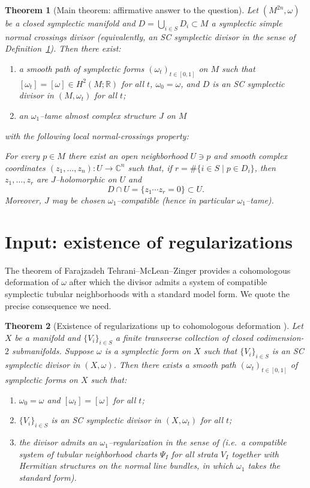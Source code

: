 \documentclass[11pt]{article}
\newtheorem{theorem}{Theorem}
\theoremstyle{definition}
\begin{document}
\begin{theorem}[Main theorem: affirmative answer to the question]\label{thm:main}
Let $(M^{2n},\omega)$ be a closed symplectic manifold and $D=\bigcup_{i\in S}D_i\subset M$ a symplectic
simple normal crossings divisor (equivalently, an SC symplectic divisor in the sense of
Definition~\ref{thm:main}).
Then there exist:
\begin{enumerate}
\item a smooth path of symplectic forms $(\omega_t)_{t\in[0,1]}$ on $M$ such that $[\omega_t]=[\omega]\in H^2(M;\mathbb R)$ for all $t$, $\omega_0=\omega$, and $D$ is an SC symplectic divisor in $(M,\omega_t)$ for all $t$;
\item an $\omega_1$--tame almost complex structure $J$ on $M$
\end{enumerate}
with the following local normal-crossings property:

For every $p\in M$ there exist an open neighborhood $U\ni p$ and smooth complex coordinates
$(z_1,\dots,z_n)\colon U\to\mathbb C^n$ such that, if $r=\#\{i\in S\mid p\in D_i\}$, then
$z_1,\dots,z_r$ are $J$--holomorphic on $U$ and
\[
D\cap U = \{z_1\cdots z_r=0\}\subset U.
\]
Moreover, $J$ may be chosen $\omega_1$--compatible (hence in particular $\omega_1$--tame).
\end{theorem}

\section{Input: existence of regularizations}

The theorem of Farajzadeh Tehrani--McLean--Zinger provides a cohomologous deformation of $\omega$
after which the divisor admits a system of compatible symplectic tubular neighborhoods with a standard
model form. We quote the precise consequence we need.

\begin{theorem}[Existence of regularizations up to cohomologous deformation {\cite[Thm.~2.13]{FTMZ}}]\label{thm:ftmz-regularization}
Let $X$ be a manifold and $\{V_i\}_{i\in S}$ a finite transverse collection of closed codimension-$2$
submanifolds. Suppose $\omega$ is a symplectic form on $X$ such that $\{V_i\}_{i\in S}$ is an SC symplectic
divisor in $(X,\omega)$.
Then there exists a smooth path $(\omega_t)_{t\in[0,1]}$ of symplectic forms on $X$ such that:
\begin{enumerate}
\item $\omega_0=\omega$ and $[\omega_t]=[\omega]$ for all $t$;
\item $\{V_i\}_{i\in S}$ is an SC symplectic divisor in $(X,\omega_t)$ for all $t$;
\item the divisor admits an $\omega_1$--regularization in the sense of {\cite[Def.~2.12]{FTMZ}}
(i.e.\ a compatible system of tubular neighborhood charts $\Psi_I$ for all strata $V_I$ together with
Hermitian structures on the normal line bundles, in which $\omega_1$ takes the standard form).
\end{enumerate}
\end{theorem}
\end{document}

